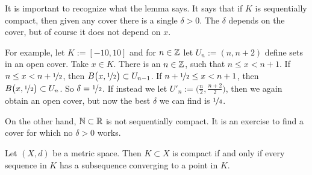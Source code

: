 It is important to recognize what the lemma says.  It says that
if $K$ is sequentially compact, then given any
cover there is a single $\delta > 0$.  The $\delta$ depends on the cover,
but of course it does not depend on $x$.

For example, let $K := [-10,10]$ and for $n \in {\mathbb{Z}}$ let $U_n :=
(n,n+2)$ define sets in an open cover.
Take $x \in K$. There is an $n \in {\mathbb{Z}}$, 
such that $n \leq x < n+1$.
If $n \leq x < n+\nicefrac{1}{2}$, then
$B\bigl(x,\nicefrac{1}{2}\bigr) \subset U_{n-1}$.
If $n+ \nicefrac{1}{2} \leq x < n+1$, then
$B\bigl(x,\nicefrac{1}{2}\bigr) \subset U_{n}$.  So $\delta =
\nicefrac{1}{2}$.  If instead we let $U'_n :=
\bigl(\frac{n}{2},\frac{n+2}{2} \bigr)$, then we again obtain an open
cover, but now the best $\delta$ we can find is $\nicefrac{1}{4}$.

On the other hand, ${\mathbb{N}} \subset {\mathbb{R}}$ is not sequentially compact.
It is an exercise to find a cover for which no $\delta > 0$ works.


\begin{thm} \label{thm:mscompactisseqcpt}
Let $(X,d)$ be a metric space.  Then $K \subset X$ is compact if
and only if every sequence in $K$ has a subsequence converging to
a point in $K$.
\end{thm}

